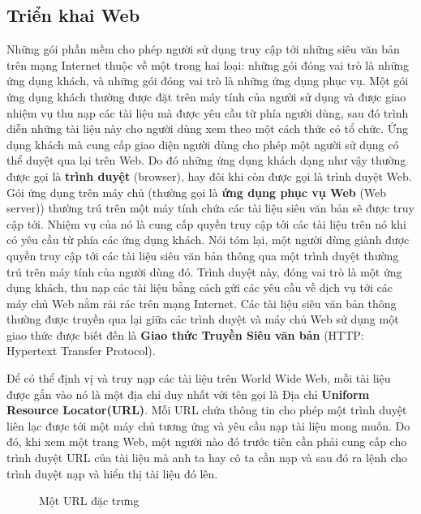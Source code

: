 \subsection*{Triển khai Web}

Những gói phần mềm cho phép người sử dụng truy cập tới những siêu văn bản trên mạng
Internet thuộc về một trong hai loại: những gói đóng vai trò là những ứng dụng khách, và
những gói đóng vai trò là những ứng dụng phục vụ. Một gói ứng dụng khách thường được đặt
trên máy tính của người sử dụng và được giao nhiệm vụ thu nạp các tài liệu mà được yêu cầu
từ phía người dùng, sau đó trình diễn những tài liệu này cho người dùng xem theo một cách
thức có tổ chức. Ứng dụng khách mà cung cấp giao diện người dùng cho phép một người sử
dụng có thể duyệt qua lại trên Web. Do đó những ứng dụng khách dạng như vậy thường được
gọi là \textbf{trình duyệt} (browser), hay đôi khi còn được gọi là trình duyệt Web. Gói
ứng dụng trên máy chủ (thường gọi là \textbf{ứng dụng phục vụ Web} (Web server)) thường
trú trên một máy tính chứa các tài liệu siêu văn bản sẽ được truy cập tới. Nhiệm vụ của nó
là cung cấp quyền truy cập tới các tài liệu trên nó khi có yêu cầu từ phía các ứng dụng
khách. Nói tóm lại, một người dùng giành được quyền truy cập tới các tài liệu siêu văn bản
thông qua một trình duyệt thường trú trên máy tính của người dùng đó. Trình duyệt này,
đóng vai trò là một ứng dụng khách, thu nạp các tài liệu bằng cách gửi các yêu cầu về dịch
vụ tới các máy chủ Web nằm rải rác trên mạng Internet. Các tài liệu siêu văn bản thông
thường được truyền qua lại giữa các trình duyệt và máy chủ Web sử dụng một giao thức được
biết đến là \textbf{Giao thức Truyền Siêu văn bản} (HTTP: Hypertext Transfer Protocol).

Để có thể định vị và truy nạp các tài liệu trên World Wide Web, mỗi tài liệu được gắn vào
nó là một địa chỉ duy nhất với tên gọi là Địa chỉ \textbf{Uniform Resource
  Locator(URL)}. Mỗi URL chứa thông tin cho phép một trình duyệt liên lạc được tới một máy
chủ tương ứng và yêu cầu nạp tài liệu mong muốn. Do đó, khi xem một trang Web, một người
nào đó trước tiên cần phải cung cấp cho trình duyệt URL của tài liệu mà anh ta hay cô ta
cần nạp và sau đó ra lệnh cho trình duyệt nạp và hiển thị tài liệu đó lên.

\begin{figure}[bt] 
  \centering {}
  \caption{Một URL đặc trưng}
  \label{fig:fig4.8}
\end{figure}


